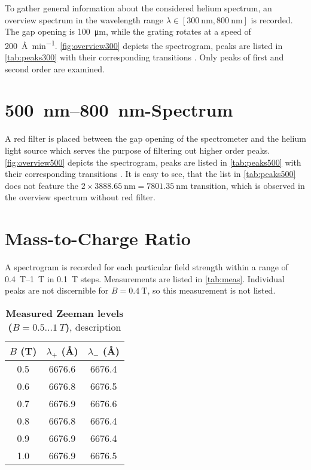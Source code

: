 To gather general information about the considered helium spectrum, an overview spectrum in the wavelength range $\lambda\in [\SI{300}{\nm}, \SI{800}{\nm}]$ is recorded.
The gap opening is \SI{100}{\um}, while the grating rotates at a speed of \SI{200}{\angstrom\per\minute}.
\autoref{fig:overview300} depicts the spectrogram, peaks are listed in \autoref{tab:peaks300} with their corresponding transitions \cite{hetrans}.
Only peaks of first and second order are examined.

\section{\SIrange{500}{800}{\nm}-Spectrum}\label{sec:500800nm}
A red filter is placed between the gap opening of the spectrometer and the helium light source which serves the purpose of filtering out higher order peaks.
\autoref{fig:overview500} depicts the spectrogram, peaks are listed in \autoref{tab:peaks500} with their corresponding transitions \cite{hetrans}.
It is easy to see, that the list in \autoref{tab:peaks500} does not feature the $2\times\SI{3888.65}{\nm} = \SI{7801.35}{\nm}$ transition, which is observed in the overview spectrum without red filter.


\section{Mass-to-Charge Ratio}
A spectrogram is recorded for each particular field strength within a range of \SIrange{0.4}{1}{\tesla} in \SI{0.1}{\tesla} steps.
Measurements are listed in \autoref{tab:meas}.
Individual peaks are not discernible for $B = \SI{0.4}{\tesla}$, so this measurement is not listed.

\begin{table}[tbp]
	\centering
	\caption[Measured Zeeman levels ($B = \num{0.5} \dots \SI{1}{T}$)]{\textbf{Measured Zeeman levels ($B = \num{0.5} \dots \SI{1}{T}$)}, description}
	\label{tab:meas}
	\begin{tabular}{SSS}
		\toprule
		{$B$ (\si{\tesla})}& {$\lambda_+$ (\si{\angstrom})}& {$\lambda_-$ (\si{\angstrom})}\\
		&	6676.6&	6676.4\\
		0.6&	6676.8&	6676.5\\
		0.7&	6676.9&	6676.6\\
		0.8&	6676.8&	6676.4\\
		0.9&	6676.9&	6676.4\\
		1.0&	6676.9&	6676.5\\
		\bottomrule
	\end{tabular}
\end{table}

